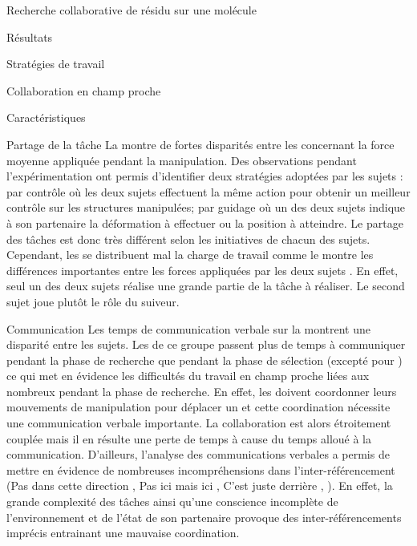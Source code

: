 \documentclass[myfrancais,ngerman,english,frenchb]{mythesis}
\begin{document}
\begin{mychapter}{Recherche collaborative de résidu sur une molécule}
\begin{mysection}{Résultats}
\begin{mysubsection}{Stratégies de travail}
\begin{mysubsubsection}{Collaboration en champ proche}
\begin{myparagraph}{Caractéristiques}
					\end{myparagraph}
					\begin{myparagraph}{Partage de la tâche}
						La  montre de fortes disparités entre les  concernant la force moyenne appliquée pendant la manipulation.
						Des observations pendant l'expérimentation ont permis d'identifier deux stratégies adoptées par les sujets : \og par contrôle \fg où les deux sujets effectuent la même action pour obtenir un meilleur contrôle sur les structures manipulées; \og par guidage \fg où un des deux sujets indique à son partenaire la déformation à effectuer ou la position à atteindre.
						Le partage des tâches est donc très différent selon les initiatives de chacun des sujets.
						Cependant, les  se distribuent mal la charge de travail comme le montre les différences importantes entre les forces appliquées par les deux sujets .
						En effet, seul un des deux sujets réalise une grande partie de la tâche à réaliser.
						Le second sujet joue plutôt le rôle du suiveur.
					\end{myparagraph}
					\begin{myparagraph}{Communication}
						Les temps de communication verbale sur la  montrent une disparité entre les sujets.
						Les  de ce groupe passent plus de temps à communiquer pendant la phase de recherche que pendant la phase de sélection (excepté pour ) ce qui met en évidence les difficultés du travail en champ proche liées aux nombreux  pendant la phase de recherche.
						En effet, les  doivent coordonner leurs mouvements de manipulation pour déplacer un  et cette coordination nécessite une communication verbale importante.
						La collaboration est alors étroitement couplée mais il en résulte une perte de temps à cause du temps alloué à la communication.
						D'ailleurs, l'analyse des communications verbales a permis de mettre en évidence de nombreuses incompréhensions dans l'inter-référencement (\og Pas dans cette direction \fg, \og Pas ici mais ici \fg, \og C'est juste derrière \fg, \myetc).
						En effet, la grande complexité des tâches ainsi qu'une conscience incomplète de l'environnement et de l'état de son partenaire provoque des inter-référencements imprécis entrainant une mauvaise coordination.

\end{myparagraph}
\end{mysubsubsection}
\end{mysubsection}
\end{mysection}
\end{mychapter}
\end{document}
